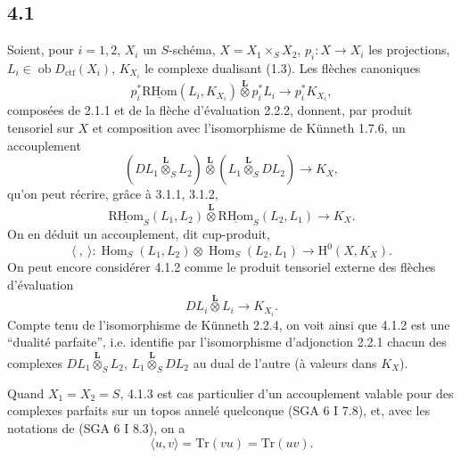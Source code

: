 \documentclass[11pt]{article}
\renewcommand{\H}{\mathrm{H}}
\DeclareMathOperator{\Hom}{Hom}
\newcommand{\ob}{\operatorname{ob}}
\providecommand{\RHom}{\mathrm{RHom}}
\providecommand{\uRHom}{\underline{\RHom}}
\providecommand{\Dctf}{D_{\mathrm{ctf}}}
\providecommand{\Dctf}{D_{\mathrm{ctf}}}
\providecommand{\RHom}{\mathrm{RHom}}
\providecommand{\Hom}{\operatorname{Hom}}
\providecommand{\ob}{\operatorname{ob}}
\providecommand{\RHom}{\mathrm R\mathcal{H}om}
\providecommand{\RHom}{\mathrm{RHom}}
\providecommand{\Hom}{\operatorname{Hom}}
\begin{document}
\subsection*{4.1}
Soient, pour $i=1,2$, $X_i$ un $S$-schéma, $X=X_1\times_SX_2$, $p_i:X\to X_i$ les projections, $L_i\in\ob\Dctf(X_i)$, $K_{X_i}$ le complexe dualisant (1.3). Les flèches canoniques
\begin{equation}
p_i^*\uRHom(L_i,K_{X_i})\overset{\mathbf L}{\otimes}p_i^*L_i
\longrightarrow p_i^*K_{X_i},
\tag{4.1.1}
\end{equation}
composées de 2.1.1 et de la flèche d'évaluation 2.2.2, donnent, par produit tensoriel sur $X$ et composition avec l'isomorphisme de Künneth 1.7.6, un accouplement
\begin{equation}
(DL_1\overset{\mathbf L}{\otimes}_S L_2)\overset{\mathbf L}{\otimes}(L_1\overset{\mathbf L}{\otimes}_S DL_2)
\longrightarrow K_X,
\tag{4.1.2}
\end{equation}
qu'on peut récrire, grâce à 3.1.1, 3.1.2,
\begin{equation}
\uRHom_S(L_1,L_2)\overset{\mathbf L}{\otimes}\uRHom_S(L_2,L_1)
\longrightarrow K_X.
\tag{4.1.3}
\end{equation}
On en déduit un accouplement, dit cup-produit,
\begin{equation}
\langle\ ,\ \rangle:\Hom_S(L_1,L_2)\otimes\Hom_S(L_2,L_1)
\longrightarrow \H^0(X,K_X).
\tag{4.1.4}
\end{equation}
On peut encore considérer 4.1.2 comme le produit tensoriel externe des flèches d'évaluation
\[
DL_i\overset{\mathbf L}{\otimes}L_i\longrightarrow K_{X_i}.
\]
Compte tenu de l'isomorphisme de Künneth 2.2.4, on voit ainsi que 4.1.2 est une ``dualité parfaite'', i.e. identifie par l'isomorphisme d'adjonction 2.2.1 chacun des complexes $DL_1\overset{\mathbf L}{\otimes}_S L_2$, $L_1\overset{\mathbf L}{\otimes}_S DL_2$ au dual de l'autre (à valeurs dans $K_X$).

Quand $X_1=X_2=S$, 4.1.3 est cas particulier d'un accouplement valable pour des complexes parfaits sur un topos annelé quelconque (SGA 6 I 7.8), et, avec les notations de (SGA 6 I 8.3), on a
\begin{equation}
\langle u,v\rangle=\mathrm{Tr}(vu)=\mathrm{Tr}(uv).
\tag{4.1.5}
\end{equation}
\end{document}
